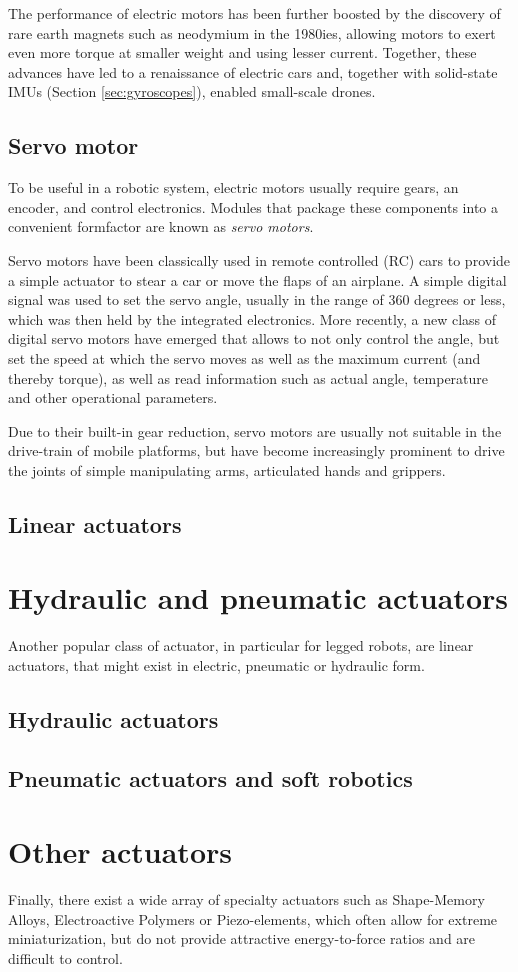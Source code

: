 The performance of electric motors has been further boosted by the discovery of rare earth magnets such as neodymium in the 1980ies, allowing motors to exert even more torque at smaller weight and using lesser current. Together, these advances have led to a renaissance of electric cars and, together with solid-state IMUs (Section \ref{sec:gyroscopes}), enabled small-scale drones.

\subsection{Servo motor}
To be useful in a robotic system, electric motors usually require gears, an encoder, and control electronics. Modules that package these components into a convenient formfactor are known as \emph{servo motors}. 

Servo motors have been classically used in remote controlled (RC) cars to provide a simple actuator to stear a car or move the flaps of an airplane. A simple digital signal was used to set the servo angle, usually in the range of 360 degrees or less, which was then held by the integrated electronics. More recently, a new class of digital servo motors have emerged that allows to not only control the angle, but set the speed at which the servo moves as well as the maximum current (and thereby torque), as well as read information such as actual angle, temperature and other operational parameters. 

Due to their built-in gear reduction, servo motors are usually not suitable in the drive-train of mobile platforms, but have become increasingly prominent to drive the joints of simple manipulating arms, articulated hands and grippers. 

\subsection{Linear actuators}

\section{Hydraulic and pneumatic actuators}
Another popular class of actuator, in particular for legged robots, are linear actuators, that might exist in electric, pneumatic or hydraulic form. 

\subsection{Hydraulic actuators}
\subsection{Pneumatic actuators and soft robotics}
 
\section{Other actuators} 
 Finally, there exist a wide array of specialty actuators such as Shape-Memory Alloys, Electroactive Polymers or Piezo-elements, which often allow for extreme miniaturization, but do not provide attractive energy-to-force ratios and are difficult to control.
